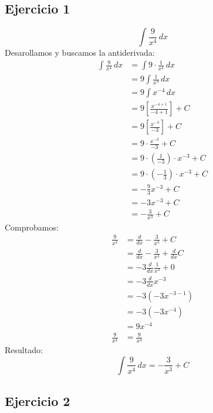 \documentclass[letterpaper]{article}
\begin{document}
	\subsection*{Ejercicio 1} %
		\vspace{0.5cm}
		\[ \int \frac{9}{x^4} \, dx  \]
		\vspace{0.5cm}
		\vspace{0.2cm}
		Desarollamos y buscamos la antiderivada:
		\begin{align*}
			\int \frac{9}{x^4} \, dx &= \int 9 \cdot \frac{1}{x^4} \, dx \\
			&= 9 \int \frac{1}{x^4} \, dx \\
			&= 9 \int x^{-4} \, dx \\
			&= 9 \left[ \frac{x^{-4 + 1}}{-4 + 1} \right] + C \\
			&= 9 \left[ \frac{x^{-3}}{-3} \right] + C \\
			&= 9 \cdot \frac{x^{-3}}{-3} + C \\
			&= 9 \cdot \left( \frac{1}{-3} \right) \cdot x^{-3} + C \\
			&= 9 \cdot \left( -\frac{1}{3} \right) \cdot x^{-3} + C \\
			&= -\frac{9}{3} x^{-3} + C \\
			&= -3 x^{-3} + C \\
			&= -\frac{3}{x^3} + C
		\end{align*}
		\vspace{0.2cm}
		Comprobamos:
		\begin{align*}
			\frac{9}{x^4} &= \frac{d}{dx} -\frac{3}{x^3} + C \\
			&= \frac{d}{dx} -\frac{3}{x^3} + \frac{d}{dx} C \\
			&= -3 \frac{d}{dx} \frac{1}{x^3} + 0 \\
			&= -3 \frac{d}{dx} x^{-3} \\
			&= -3 \left( -3 x^{-3 - 1} \right) \\
			&= -3 \left( -3 x^{-4} \right) \\
			&= 9 x^{-4} \\
			\frac{9}{x^4} &= \frac{9}{x^4}
		\end{align*}
		\vspace{0.2cm}
		Resultado:
		\[ \int \frac{9}{x^4} \, dx = -\frac{3}{x^3} + C\]
		
	\subsection*{Ejercicio 2} %
		
\end{document}
